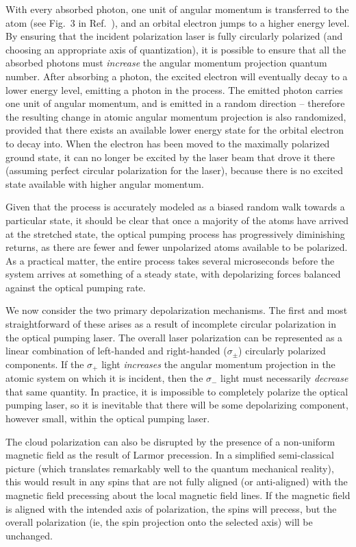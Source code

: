 With every absorbed photon, one unit of angular momentum is transferred to the atom (see Fig.~3 in Ref.~\cite{ben_OP}), and an orbital electron jumps to a higher energy level.  By ensuring that the incident polarization laser is fully circularly polarized (and choosing an appropriate axis of quantization), it is possible to ensure that all the absorbed photons must \emph{increase} the angular momentum projection quantum number.  After absorbing a photon, the excited electron will eventually decay to a lower energy level, emitting a photon in the process.  The emitted photon carries one unit of angular momentum, and is emitted in a random direction -- therefore the resulting change in atomic angular momentum projection is also randomized, provided that there exists an available lower energy state for the orbital electron to decay into.   When the electron has been moved to the maximally polarized ground state, it can no longer be excited by the laser beam that drove it there (assuming perfect circular polarization for the laser), because there is no excited state available with higher angular momentum.  

Given that the process is accurately modeled as a biased random walk towards a particular state, it should be clear that once a majority of the atoms have arrived at the stretched state, the optical pumping process has progressively diminishing returns, as there are fewer and fewer unpolarized atoms available to be polarized.  As a practical matter, the entire process takes several microseconds before the system arrives at something of a steady state, with depolarizing forces balanced against the optical pumping rate.

We now consider the two primary depolarization mechanisms.  The first and most straightforward of these arises as a result of incomplete circular polarization in the optical pumping laser.  The overall laser polarization can be represented as a linear combination of left-handed and right-handed ($\sigma_{\pm}$) circularly polarized components.  If the $\sigma_{+}$ light \emph{increases} the angular momentum projection in the atomic system on which it is incident, then the $\sigma_{-}$ light must necessarily \emph{decrease} that same quantity.  In practice, it is impossible to completely polarize the optical pumping laser, so it is inevitable that there will be some depolarizing component, however small, within the optical pumping laser.

The cloud polarization can also be disrupted by the presence of a non-uniform magnetic field as the result of Larmor precession.  In a simplified semi-classical picture (which translates remarkably well to the quantum mechanical reality), this would result in any spins that are not fully aligned (or anti-aligned) with the magnetic field precessing about the local magnetic field lines.  If the magnetic field is aligned with the intended axis of polarization, the spins will precess, but the overall polarization (ie, the spin projection onto the selected axis) will be unchanged.  

